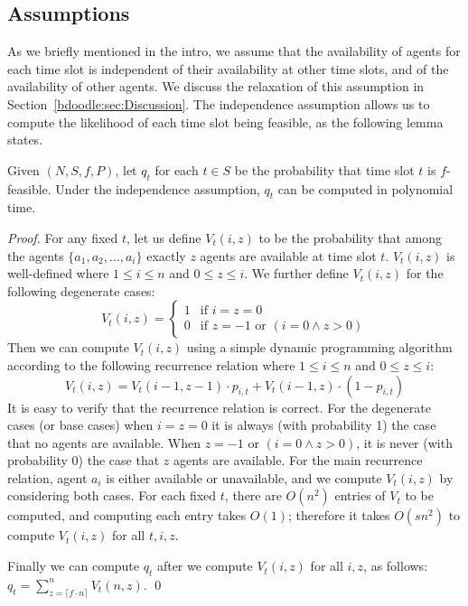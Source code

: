 \subsection{Assumptions}
As we briefly mentioned in the intro, we assume that the availability of agents for each time slot is independent of their availability at other time slots, and of the availability of other agents.  We discuss the relaxation of this assumption in Section~\ref{bdoodle:sec:Discussion}. The independence assumption allows us to compute the likelihood of each time slot being feasible, as the following lemma states. 
\begin{lemma} \label{bdoodle:lemma:q_t_polytime}
Given $(N, S, f, P)$, let $q_t$ for each $t\in S$ be the probability that time slot $t$ is $f$-feasible. Under the independence assumption, $q_t$ can be computed in polynomial time.
\end{lemma}
\begin{proof}
For any fixed $t$, let us define $V_t(i, z)$ to be the probability that among the agents $\{a_1, a_2, \dots, a_i\}$ exactly $z$ agents are available at time slot $t$. $V_t(i, z)$ is well-defined where $1 \leq i \leq n$ and $0 \leq z \leq i$. We further define $V_t(i, z)$ for the following degenerate cases:
\begin{equation*}
V_t(i, z) =
\begin{cases} 
	1 & \mbox{if~} i = z = 0 \\
	0 & \mbox{if~} z = -1 \mbox{~or~} (i = 0 \land z > 0)
\end{cases}
\end{equation*}
Then we can compute $V_t(i, z)$ using a simple dynamic programming algorithm according to the following recurrence relation where $1 \leq i \leq n$ and $0 \leq z \leq i$:
\begin{equation} \label{bdoodle:eqn:vt_precompute}
V_t(i, z) = V_t(i-1, z-1) \cdot p_{i,t} + V_t(i-1, z) \cdot (1- p_{i,t}) 
\end{equation}
It is easy to verify that the recurrence relation is correct. For the degenerate cases (or base cases) when $i = z = 0$ it is always (with probability 1) the case that no agents are available. When $z = -1$ or $(i=0 \land z>0)$, it is never (with probability 0) the case that $z$ agents are available. For the main recurrence relation, agent $a_i$ is either available or unavailable, and we compute $V_t(i, z)$ by considering both cases. For each fixed $t$, there are $O(n^2)$ entries of $V_t$ to be computed, and computing each entry takes $O(1)$; therefore it takes $O(sn^2)$ to compute $V_t(i, z)$ for all $t, i, z$. 

Finally we can compute $q_t$ after we compute $V_t(i, z)$ for all $i,z$, as follows:
$q_t = \sum_{z = \lceil f \cdot n \rceil}^{n} V_t(n, z)$.
\qed
\end{proof}

